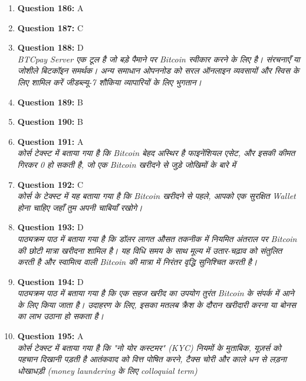 \documentclass[12pt,a4paper]{article}
\begin{document}
\begin{enumerate}
\item \textbf{Question 186:} A

\item \textbf{Question 187:} C

\item \textbf{Question 188:} D
\\ \textit{BTCpay Server एक टूल है जो बड़े पैमाने पर Bitcoin स्वीकार करने के लिए है। संरचनाएँ या जोशीले बिटकॉइन समर्थक। अन्य समाधान ओपननोड को सरल ऑनलाइन व्यवसायों और स्विस के लिए शामिल करें जीडब्ल्यू-7 शौकिया व्यापारियों के लिए भुगतान।}

\item \textbf{Question 189:} B

\item \textbf{Question 190:} B

\item \textbf{Question 191:} A
\\ \textit{कोर्स टेक्स्ट में बताया गया है कि Bitcoin बेहद अस्थिर है फाइनेंशियल एसेट, और इसकी कीमत गिरकर 0 हो सकती है, जो एक Bitcoin खरीदने से जुड़े जोखिमों के बारे में}

\item \textbf{Question 192:} C
\\ \textit{कोर्स के टेक्स्ट में यह बताया गया है कि Bitcoin खरीदने से पहले, आपको एक सुरक्षित Wallet होना चाहिए जहाँ तुम अपनी चाबियाँ रखोगे।}

\item \textbf{Question 193:} D
\\ \textit{पाठ्यक्रम पाठ में बताया गया है कि डॉलर लागत औसत तकनीक में नियमित अंतराल पर Bitcoin की छोटी मात्रा खरीदना शामिल है। यह विधि समय के साथ मूल्य में उतार-चढ़ाव को संतुलित करती है और स्वामित्व वाली Bitcoin की मात्रा में निरंतर वृद्धि सुनिश्चित करती है।}

\item \textbf{Question 194:} D
\\ \textit{पाठ्यक्रम पाठ में बताया गया है कि एक सहज खरीद का उपयोग तुरंत Bitcoin के संपर्क में आने के लिए किया जाता है। उदाहरण के लिए, इसका मतलब क्रैश के दौरान खरीदारी करना या बोनस का लाभ उठाना हो सकता है।}

\item \textbf{Question 195:} A
\\ \textit{कोर्स टेक्स्ट में बताया गया है कि "नो योर कस्टमर" (KYC) नियमों के मुताबिक, यूज़र्स को पहचान दिखानी पड़ती है आतंकवाद को वित्त पोषित करने, टैक्स चोरी और काले धन से लड़ना धोखाधड़ी (money laundering के लिए colloquial term)}


\end{enumerate}
\end{document}
